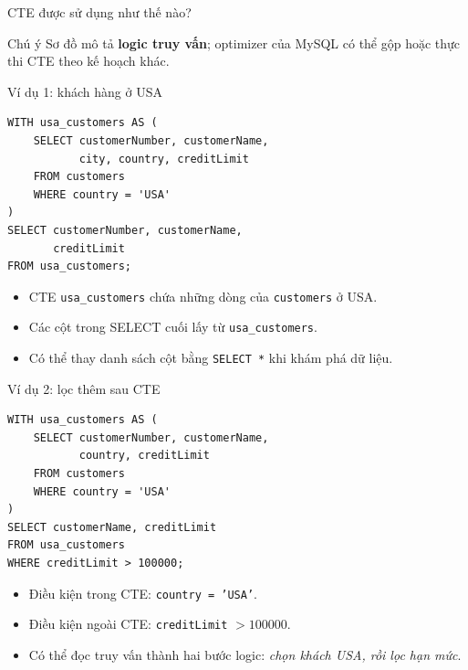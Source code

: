 \documentclass[aspectratio=169,10pt]{beamer}
\newcommand{\code}[1]{\texttt{#1}}
\begin{document}
\begin{frame}[fragile]{CTE được sử dụng như thế nào?}

\begin{center}
\end{center}
\begin{alertblock}{Chú ý}
Sơ đồ mô tả \textbf{logic truy vấn}; optimizer của MySQL có thể gộp hoặc thực thi CTE theo kế hoạch khác.
\end{alertblock}
\end{frame}

\begin{frame}[fragile]{Ví dụ 1: khách hàng ở USA}
\small
\begin{lstlisting}[basicstyle=\ttfamily\scriptsize]
WITH usa_customers AS (
    SELECT customerNumber, customerName,
           city, country, creditLimit
    FROM customers
    WHERE country = 'USA'
)
SELECT customerNumber, customerName,
       creditLimit
FROM usa_customers;
\end{lstlisting}
\vspace{.1em}
\begin{itemize}
\item CTE \code{usa\_customers} chứa những dòng của \code{customers} ở USA.
\item Các cột trong SELECT cuối lấy từ \code{usa\_customers}.
\item Có thể thay danh sách cột bằng \code{SELECT *} khi khám phá dữ liệu.
\end{itemize}
\end{frame}

\begin{frame}[fragile]{Ví dụ 2: lọc thêm sau CTE}
\small
\begin{lstlisting}[basicstyle=\ttfamily\scriptsize]
WITH usa_customers AS (
    SELECT customerNumber, customerName,
           country, creditLimit
    FROM customers
    WHERE country = 'USA'
)
SELECT customerName, creditLimit
FROM usa_customers
WHERE creditLimit > 100000;
\end{lstlisting}
\vspace{.1em}
\begin{itemize}
\item Điều kiện trong CTE: \code{country = 'USA'}.
\item Điều kiện ngoài CTE: \code{creditLimit} $>100000$.
\item Có thể đọc truy vấn thành hai bước logic: \emph{chọn khách USA, rồi lọc hạn mức}.
\end{itemize}
\end{frame}
\end{document}
